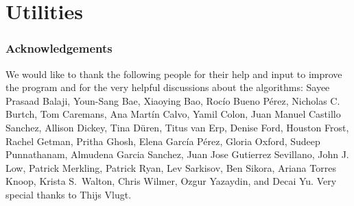 \documentclass[onecolumn]{book}
\begin{document}
\part{Utilities}




\section*{Acknowledgements}
We would like to thank the following people for their help and input to improve the program and for
the very helpful discussions about the algorithms: Sayee Prasaad Balaji, Youn-Sang Bae, Xiaoying Bao, Roc\'io Bueno P\'erez,
Nicholas C. Burtch, Tom Caremans, Ana Mart\'in Calvo, Yamil Colon,
Juan Manuel Castillo Sanchez, Allison Dickey, Tina D\"uren, Titus van Erp, Denise Ford,
Houston Frost, Rachel Getman,  Pritha Ghosh, Elena Garc\'ia P\'erez, Gloria Oxford, Sudeep Punnathanam, Almudena Garcia Sanchez, Juan Jose Gutierrez Sevillano,
John J. Low, Patrick Merkling, Patrick Ryan, Lev Sarkisov, Ben Sikora, Ariana Torres Knoop, Krista S.\ Walton, Chris Wilmer, Ozgur Yazaydin, and Decai Yu.
Very special thanks to Thijs Vlugt.
\end{document}

